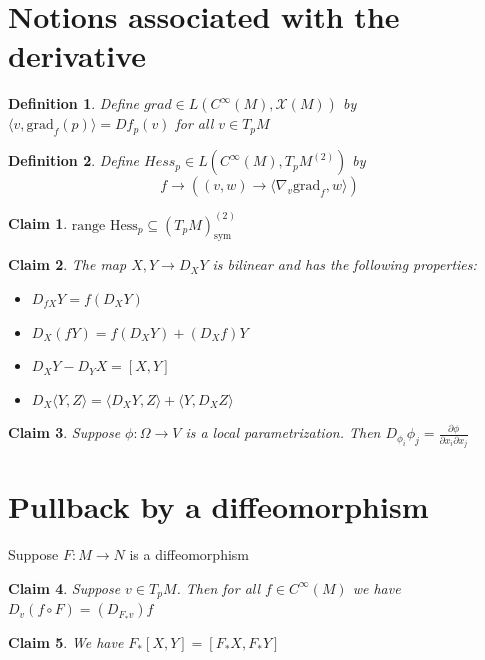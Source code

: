 \documentclass{article}
\newtheorem{definition}{Definition}
\newtheorem{claim}{Claim}
\begin{document}
\section{Notions associated with the derivative}

\begin{definition}
    Define $grad \in L(C^\infty(M),\mathcal{X}(M))$ by $\langle v,\text{grad}_f(p) \rangle = Df_p(v)$ for all $v \in T_pM$
\end{definition}

\begin{definition}
    Define $Hess_p \in L(C^\infty(M),T_pM^{(2)})$ by \[f \to ((v,w) \to \langle \nabla_v\text{grad}_f,w\rangle)\]
\end{definition}

\begin{claim}
    $\text{range }\text{Hess}_p \subseteq (T_pM)^{(2)}_{\text{sym}}$
\end{claim}

\begin{claim}
    The map $X,Y \to D_XY$ is bilinear and has the following properties:
    \begin{itemize}
        \item $D_{fX}Y=f(D_XY)$
        \item $D_X(fY)=f(D_XY) + (D_Xf)Y$
        \item $D_XY-D_YX=[X,Y]$
        \item $D_X\langle Y, Z \rangle = \langle D_XY,Z \rangle + \langle Y, D_XZ \rangle$
    \end{itemize}
\end{claim}

\begin{claim}
    Suppose $\phi: \Omega \to V$ is a local parametrization. Then $D_{\phi_i}\phi_j=\frac{\partial \phi}{\partial x_i \partial x_j}$
\end{claim}

\section{Pullback by a diffeomorphism}

Suppose $F:M \to N$ is a diffeomorphism

\begin{claim}
     Suppose $v \in T_pM$. Then for all $f \in C^\infty(M)$ we have $D_v(f \circ F)=(D_{F_*v})f$
\end{claim}

\begin{claim}
    We have $F_*[X,Y]=[F_*X,F_*Y]$
\end{claim}
\end{document}
